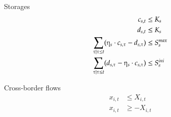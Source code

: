 \documentclass[a4paper,11pt]{article}
\begin{document}
\begin{multicols}{2}
Storages
\begin{subequations}
\begin{align}
c_{s,t} &\leq K_{s}\label{eq:charing_max}\\
d_{s,t} &\leq K_{s} \label{eq:discharging_max}\\
\sum_{\tau | \tau \leq t} (\etaup_{s} \cdot c_{s,\tau} - d_{s,\tau}) &\leq S_{s}^{max}\label{eq:cap_max}\\
\sum_{\tau | \tau \leq t} (d_{s,\tau} - \etaup_{s} \cdot c_{s,\tau}) &\leq S_{s}^{ini}\label{eq:cap_ini}
\end{align}
\end{subequations}

Cross-border flows
\begin{subequations}
\begin{align}
x_{i,t} &\leq X_{i,t}\label{eq:flow_max}\\
x_{i,t} &\geq -X_{i,t}\label{eq:flow_min}
\end{align}
\end{subequations}




\end{multicols}
\end{document}
